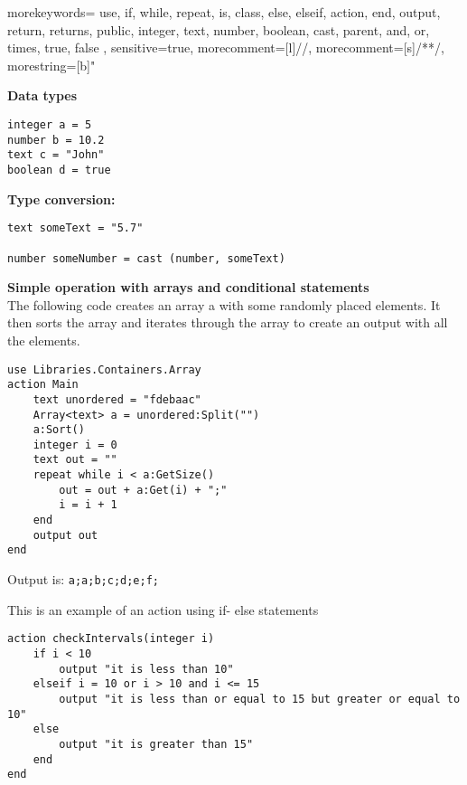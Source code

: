 {
  morekeywords={
    use,
    if,
    while,
    repeat,
    is,
    class,
    else,
    elseif,
    action,
    end,
    output,
    return,
    returns,
    public,
    integer,
    text,
    number,
    boolean,
    cast,
    parent,
    and,
    or,
    times,
    true,
    false
  },
  sensitive=true, %
  morecomment=[l]{//}, %
  morecomment=[s]{/*}{*/}, %
  morestring=[b]" %
}

\textbf{Data types}\\
\begin{lstlisting}[language=Quorum]
integer a = 5
number b = 10.2
text c = "John"
boolean d = true
\end{lstlisting}

\textbf{Type conversion:}\\
\begin{lstlisting}[language=Quorum]
text someText = "5.7"

number someNumber = cast (number, someText)
\end{lstlisting}

\textbf{Simple operation with arrays and conditional statements}\\
The following code creates an array a with some randomly placed elements. It then sorts the array and iterates through the array to create an output with all the elements.

\begin{lstlisting}[language=Quorum]
use Libraries.Containers.Array
action Main
	text unordered = "fdebaac"
	Array<text> a = unordered:Split("")
	a:Sort()
	integer i = 0
	text out = ""
	repeat while i < a:GetSize()
		out = out + a:Get(i) + ";"
		i = i + 1
	end
	output out
end
\end{lstlisting}

Output is:
\lstinline!a;a;b;c;d;e;f;!

This is an example of an action using if- else statements

\begin{lstlisting}[language=Quorum]
action checkIntervals(integer i)
    if i < 10
        output "it is less than 10"
    elseif i = 10 or i > 10 and i <= 15
        output "it is less than or equal to 15 but greater or equal to 10"
    else
        output "it is greater than 15"
    end
end
\end{lstlisting}

